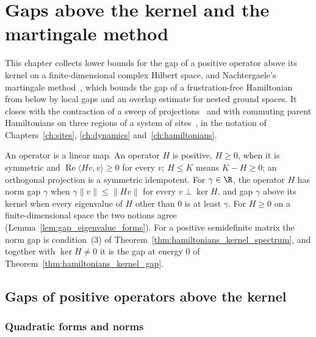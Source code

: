 \chapter{Gaps above the kernel and the martingale method}
\label{ch:martingale_gaps}

This chapter collects lower bounds for the gap of a positive operator above its
kernel on a finite-dimensional complex Hilbert space, and Nachtergaele's martingale
method~\cite{Nachtergaele1996Spectral}, which bounds the gap of a frustration-free
Hamiltonian from below by local gaps and an overlap estimate for nested ground
spaces. It closes with the contraction of a sweep of projections~\cite{Anshu2016Simple}
and with commuting parent Hamiltonians on three regions of a system of
sites~\cite[Appendix~D.2]{Cirac2016MPDO_arXiv}, in the notation of
Chapters~\ref{ch:sites}, \ref{ch:dynamics} and~\ref{ch:hamiltonians}.

An operator is a linear map. An operator $H$ is positive, $H\ge0$, when it is
symmetric and $\operatorname{Re}\langle Hv,v\rangle\ge0$ for every $v$; $H\le K$ means
$K-H\ge0$; an orthogonal projection is a symmetric idempotent. For $\gamma\in\R$, the
operator $H$ has norm gap $\gamma$ when $\gamma\lVert v\rVert\le\lVert Hv\rVert$ for every
$v\perp\ker H$, and gap $\gamma$ above its kernel when every eigenvalue of $H$ other
than $0$ is at least $\gamma$. For $H\ge0$ on a finite-dimensional space the two notions
agree (Lemma~\ref{lem:gap_eigenvalue_forms}). For a positive semidefinite matrix the norm
gap is condition~(3) of Theorem~\ref{thm:hamiltonians_kernel_spectrum}, and together with
$\ker H\neq0$ it is the gap at energy $0$ of Theorem~\ref{thm:hamiltonians_kernel_gap}.

\section{Gaps of positive operators above the kernel}
\label{sec:martingale_gaps_kernel}

\subsection{Quadratic forms and norms}
\label{sec:martingale_gaps_forms}


